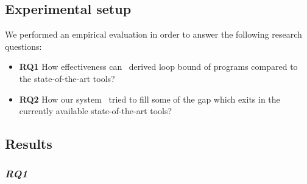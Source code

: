 \subsection{Experimental setup}


We performed an empirical evaluation in order to answer the following research questions:

\begin{itemize} 
	
	\item \textbf{RQ1} How effectiveness can \SystemName\ derived loop bound of programs compared to the state-of-the-art tools? 
	\item \textbf{RQ2} How our system \SystemName\ tried to fill some of the gap which exits in the currently available state-of-the-art tools?
\end{itemize}

\subsection{Results}




\subsubsection{\textbf{\textit{RQ1}}} 

